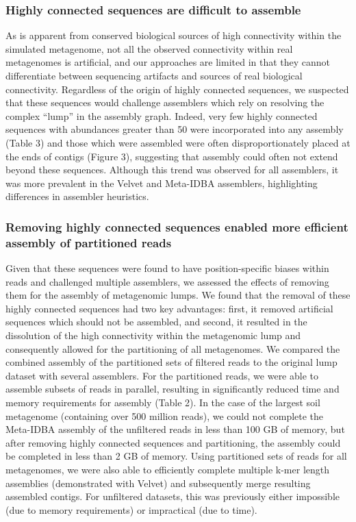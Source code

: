 \documentclass[10pt]{article}
\begin{document}
\subsubsection*{Highly connected sequences are difficult to assemble}
As is apparent from conserved biological sources of high connectivity within the simulated metagenome, not all the observed connectivity within real metagenomes is artificial, and our approaches are limited in that they cannot differentiate between sequencing artifacts and sources of real biological connectivity.  Regardless of the origin of highly connected sequences, we suspected that these sequences would challenge assemblers which rely on resolving the complex ``lump'' in the assembly graph.  Indeed, very few highly connected sequences with abundances greater than 50 were incorporated into any assembly (Table 3) and those which were assembled were often disproportionately placed at the ends of contigs (Figure 3), suggesting that assembly could often not extend beyond these sequences.  Although this trend was observed for all assemblers, it was more prevalent in the Velvet and Meta-IDBA assemblers, highlighting differences in assembler heuristics.  

\subsubsection*{Removing highly connected sequences enabled more efficient assembly of partitioned reads}
Given that these sequences were found to have position-specific biases within reads and challenged multiple assemblers, we assessed the effects of removing them for the assembly of metagenomic lumps.  We found that the removal of these highly connected sequences had two key advantages:  first, it removed artificial sequences which should not be assembled, and second, it resulted in the dissolution of the high connectivity within the metagenomic lump and consequently allowed for the partitioning of all metagenomes.  We compared the combined assembly of the partitioned sets of filtered reads to the original lump dataset with several assemblers.  For the partitioned reads, we were able to assemble subsets of reads in parallel, resulting in significantly reduced time and memory requirements for assembly (Table 2).  In the case of the largest soil metagenome (containing over 500 million reads), we could not complete the Meta-IDBA assembly of the unfiltered reads in less than 100 GB of memory, but after removing highly connected sequences and partitioning, the assembly could be completed in less than 2 GB of memory.  Using partitioned sets of reads for all metagenomes, we were also able to efficiently complete multiple k-mer length assemblies (demonstrated with Velvet) and subsequently merge resulting assembled contigs.  For unfiltered datasets, this was previously either impossible (due to memory requirements) or impractical (due to time).   
\end{document}
